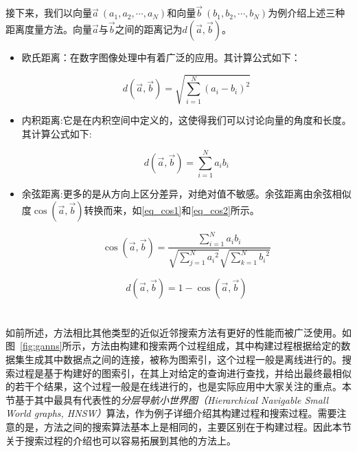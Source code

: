接下来，我们以向量$\overrightarrow a~({a_1},{a_2}, \cdots ,{a_N})$和向量$\overrightarrow b~({b_1},{b_2}, \cdots ,{b_N})$为例介绍上述三种距离度量方法。向量$\overrightarrow a $与$\overrightarrow b $之间的距离记为$d(\overrightarrow a ,\overrightarrow b )$。
\begin{itemize}
    \item 欧氏距离：在数字图像处理中有着广泛的应用。其计算公式如下：
    
    \begin{equation}
    d(\overrightarrow a ,\overrightarrow b ) = \sqrt {\sum\limits_{i = 1}^N {{{({a_i} - {b_i})}^2}} } \label{eq_Eu}
    \end{equation}
    
    \item 内积距离:它是在内积空间中定义的，这使得我们可以讨论向量的角度和长度。其计算公式如下:
    
    \begin{equation}
    d(\overrightarrow a ,\overrightarrow b ) = {\sum\limits_{i = 1}^N {{a_i}{b_i}} }\label{eq_ip}
    \end{equation}
    
    \item 余弦距离:更多的是从方向上区分差异，对绝对值不敏感。余弦距离由余弦相似度$\cos (\overrightarrow a ,\overrightarrow b )$转换而来，如\eqref{eq_cos1}和\eqref{eq_cos2}所示。
    
    \begin{equation}
   \cos (\overrightarrow a ,\overrightarrow b ) = \frac{{\sum\limits_{i = 1}^N {{a_i}{b_i}} }}{{\sqrt {\sum\limits_{j = 1}^N {{a_i}^2} } \sqrt {\sum\limits_{k = 1}^N {{b_i}^2} } }}\label{eq_cos1}
    \end{equation}
    
     \begin{equation}
    d(\overrightarrow a ,\overrightarrow b ) = 1 - \cos (\overrightarrow a ,\overrightarrow b )\label{eq_cos2}
    \end{equation}
\end{itemize}



\section{\ganns}\label{sec:bg-ganns}
如前所述，\ganns 方法相比其他类型的近似近邻搜索方法有更好的性能而被广泛使用。如图~\ref{fig:ganns}所示，\ganns 方法由构建和搜索两个过程组成，其中构建过程根据给定的数据集生成其中数据点之间的连接，被称为图索引，这个过程一般是离线进行的。搜索过程是基于构建好的图索引，在其上对给定的查询进行查找，并给出最终最相似的若干个结果，这个过程一般是在线进行的，也是实际应用中大家关注的重点。本节基于其中最具有代表性的\textit{分层导航小世界图（Hierarchical Navigable Small World graphs, HNSW）\cite{hnsw-2018}}算法，作为例子详细介绍其构建过程和搜索过程。需要注意的是，\ganns 方法之间的搜索算法基本上是相同的，主要区别在于构建过程。因此本节关于搜索过程的介绍也可以容易拓展到其他的\ganns 方法上。

